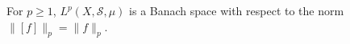 For $p \geq 1$, $L^p(X, \mathcal{S}, \mu)$ is a Banach space with respect to the norm $\|[f]\|_p = \|f\|_p$.
